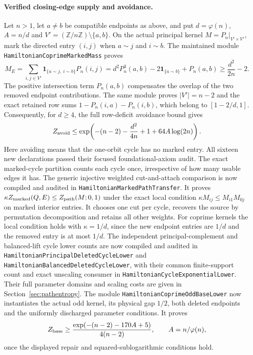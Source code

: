 \paragraph{Verified closing-edge supply and avoidance.}
Let \(n>1\), let \(a\ne b\) be compatible endpoints as above, and put
\(d=\varphi(n)\), \(A=n/d\) and \(V'=(\mathbb Z/n\mathbb Z)\setminus\{a,b\}\).
On the actual principal kernel \(M=P_n|_{V'\times V'}\), mark the directed
entry \((i,j)\) when \(a\sim j\) and \(i\sim b\).
The maintained module \texttt{HamiltonianCoprimeMarkedMass} proves
\[
 M_E=\sum_{i,j\in V'}\mathbf1_{\{a\sim j,\ i\sim b\}}P_n(i,j)
     =d^2P_n^3(a,b)-2\mathbf1_{\{a\sim b\}}+P_n(a,b)
     \geq \frac{d^2}{2n}-2.
\]
The positive intersection term \(P_n(a,b)\) compensates the overlap
of the two removed endpoint contributions.
The same module proves \(|V'|=n-2\) and the exact retained row sums
\(1-P_n(i,a)-P_n(i,b)\), which belong to \([1-2/d,1]\).
Consequently, for \(d\geq4\), the full row-deficit avoidance bound gives
\[
 Z_{\rm avoid}\leq
 \exp\!\left(-(n-2)-\frac{d^2}{4n}+1+64A\log(2n)\right).
\]
Here avoiding means that the one-orbit cycle has no marked entry.
All sixteen new declarations passed their focused foundational-axiom
audit. The exact marked-cycle partition counts each cycle once,
irrespective of how many usable edges it has.
The generic injective weighted cut-and-attach comparison is now
compiled and audited in \texttt{HamiltonianMarkedPathTransfer}.
It proves \(\kappa Z_{\rm marked}(Q,E)\leq Z_{\rm path}(M;0,1)\)
under the exact local condition \(\kappa M_{ij}\leq M_{i1}M_{0j}\)
on marked interior entries.
It chooses one cut per cycle, recovers the source by permutation
decomposition and retains all other weights.
For coprime kernels the local condition holds with
\(\kappa=1/d\), since the new endpoint entries are \(1/d\) and
the removed entry is at most \(1/d\).
The independent principal-complement and balanced-lift cycle lower
counts are now compiled and audited in
\texttt{HamiltonianPrincipalDeletedCycleLower} and
\texttt{HamiltonianBalancedDeletedCycleLower}, with their common
finite-support count and exact unscaling consumer in
\texttt{HamiltonianCycleExponentialLower}.
Their full parameter domains and scaling costs are given in
Section~\ref{sec:pathentropy}.
The module \texttt{HamiltonianCoprimeOddBaseLower} now instantiates
the actual odd kernel, its physical gap \(1/2\), both deleted
endpoints and the uniformly discharged parameter conditions. It proves
\[
 Z_{\rm base}\geq
       \frac{\exp(-(n-2)-170A+5)}{4(n-2)},
       \qquad A=n/\varphi(n),
\]
once the displayed repair and squared-sublogarithmic conditions hold.
